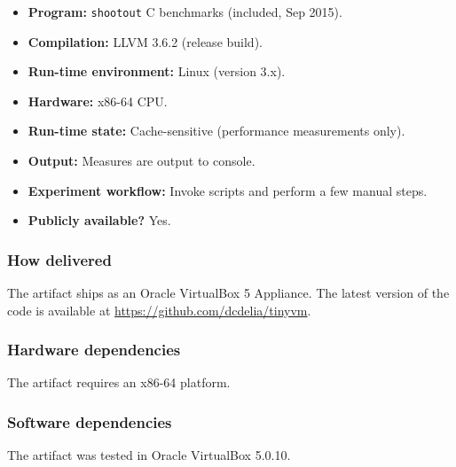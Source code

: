 {\small
\begin{itemize}
  \item {\bf Program: } {\tt shootout} C benchmarks (included, Sep 2015). %
  \item {\bf Compilation: } LLVM 3.6.2 (release build).
  \item {\bf Run-time environment: } Linux (version 3.x).
  \item {\bf Hardware: } x86-64 CPU.
  \item {\bf Run-time state: } Cache-sensitive (performance measurements only).
  \item {\bf Output: } Measures are output to console.
  \item {\bf Experiment workflow: } Invoke scripts and perform a few manual steps.
  \item {\bf Publicly available?} Yes.
\end{itemize}
}

\subsubsection{How delivered}

The artifact ships as an Oracle VirtualBox 5 Appliance.
The latest version of the code is available at \url{https://github.com/dcdelia/tinyvm}.

\subsubsection{Hardware dependencies}

The artifact requires an x86-64 platform.

\subsubsection{Software dependencies}

The artifact was tested in Oracle VirtualBox 5.0.10. 


